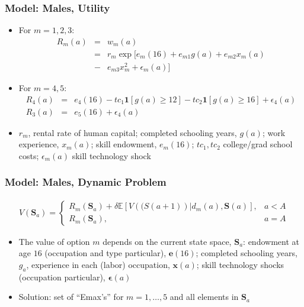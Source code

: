 \begin{frame}
	\frametitle{Model: Males, Utility}
	\begin{itemize}
		\item For $m = 1, 2, 3$:
		\begin{eqnarray}
			R_{m}(a) &=& w_{m}(a) \nonumber \\
			         &=& r_{m} \exp [ e_{m}(16) + e_{m1}g(a) + e_{m2}x_{m}(a) \nonumber \\ 
			         &-& e_{m3}x_{m}^2 + \epsilon_{m}(a) ] \nonumber
		\end{eqnarray}
		\item For $m = 4, 5$:
		\begin{eqnarray}
			R_{4}(a) &=& e_{4}(16) - tc_{1} \mathbf{1} [g(a) \geq 12] - tc_{2} \mathbf{1} [g(a) \geq 16] + \epsilon_{4}(a) \nonumber \\
			R_{3}(a) &=& e_{5}(16) + \epsilon_{4}(a) \nonumber
		\end{eqnarray}
		\item $r_{m}$, rental rate of human capital; completed schooling years, $g(a)$; work experience, $x_{m}(a)$; skill endowment, $e_{m}(16)$; $tc_{1},tc_{2}$ college/grad school costs; $\epsilon_{m}(a)$ skill technology shock
	\end{itemize}
\end{frame}

\begin{frame}
	\frametitle{Model: Males, Dynamic Problem}
	\begin{eqnarray}
	V(\mathbf{S}_{a}) =
		\begin{cases}
			R_{m} (\mathbf{S}_{a}) + \delta \mathbb{E} \left[ V (\mathbf(S(a+1)) | d_{m}(a), \mathbf{S}(a) \right], & a < A \nonumber \\
			R_{m} (\mathbf{S}_{a}) \nonumber, & a = A
		\end{cases}
	\end{eqnarray}
	\begin{itemize}
		\item The value of option $m$ depends on the current state space, $\mathbf{S}_a$: endowment at age $16$ (occupation and type particular), $\mathbf{e}(16)$; completed schooling years, $g_{a}$, experience in each (labor) occupation, $\mathbf{x}(a)$; skill technology shocks (occupation particular), $\mathbf{\epsilon}(a)$
		\item Solution: set of ``Emax's'' for $m = 1, \ldots, 5$ and all elements in $\mathbf{S}_a$
	\end{itemize}
\end{frame}


